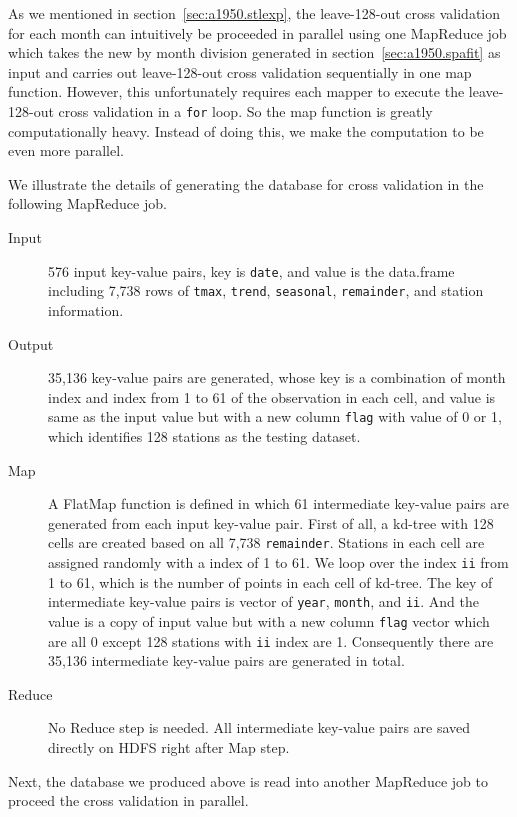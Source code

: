 As we mentioned in section~\ref{sec:a1950.stlexp}, the leave-128-out cross 
validation for each month can intuitively be proceeded in parallel using one 
MapReduce job which takes the new by month division generated in 
section~\ref{sec:a1950.spafit} as input and carries out leave-128-out cross 
validation sequentially in one map function. However, this unfortunately requires
each mapper to execute the leave-128-out cross validation in a \texttt{for} loop. 
So the map function is greatly computationally heavy. Instead of doing this, we
make the computation to be even more parallel. 

We illustrate the details of generating the database for cross validation in the
following MapReduce job.

\begin{description}
  \item[Input] 576 input key-value pairs, key is \texttt{date}, and value is the 
  data.frame including 7,738 rows of \texttt{tmax}, \texttt{trend}, 
  \texttt{seasonal}, \texttt{remainder}, and station information.
  \item[Output] 35,136 key-value pairs are generated, whose key is a combination
  of month index and index from 1 to 61 of the observation in each cell, 
  and value is same as the input value but with a new column \texttt{flag} with 
  value of 0 or 1, which identifies 128 stations as the testing dataset.
  \item[Map] A FlatMap function is defined in which 61 intermediate key-value
  pairs are generated from each input key-value pair. First of all, a kd-tree with
  128 cells are created based on all 7,738 \texttt{remainder}. Stations in each 
  cell are assigned randomly with a index of 1 to 61. We loop over the index 
  \texttt{ii} from 1 to 61, which is the number of points in each cell of kd-tree. 
  The key of intermediate key-value pairs is vector of \texttt{year},
  \texttt{month}, and \texttt{ii}. And the value is a copy of input value but with
  a new column \texttt{flag} vector which are all 0 except 128 stations with 
  \texttt{ii} index are 1. Consequently there are 35,136 intermediate key-value
  pairs are generated in total.
  \item[Reduce] No Reduce step is needed. All intermediate key-value pairs are
  saved directly on HDFS right after Map step.
\end{description}

Next, the database we produced above is read into another MapReduce job to proceed 
the cross validation in parallel.

